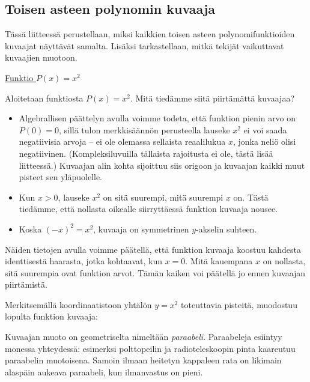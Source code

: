 \subsection*{Toisen asteen polynomin kuvaaja}
\label{paraabeli_tod}

Tässä liitteessä perustellaan, miksi kaikkien toisen asteen polynomifunktioiden kuvaajat näyttävät samalta. Lisäksi tarkastellaan, mitkä tekijät vaikuttavat kuvaajien muotoon.

\underline{Funktio $P(x)=x^2$}

Aloitetaan funktiosta $P(x)=x^2$. Mitä tiedämme siitä piirtämättä kuvaajaa?
\begin{itemize}
\item Algebrallisen päättelyn avulla voimme todeta, että funktion pienin arvo on $P(0) = 0$, sillä tulon merkkisäännön perusteella lauseke $x^2$ ei voi saada negatiivisia arvoja – ei ole olemassa sellaista reaalilukua $x$, jonka neliö olisi negatiivinen. (Kompleksiluvuilla tällaista rajoitusta ei ole, tästä lisää liitteessä.) Kuvaajan alin kohta sijoittuu siis origoon ja kuvaajan kaikki muut pisteet sen yläpuolelle.
\item Kun $x > 0$, lauseke $x^2$  on sitä
suurempi, mitä suurempi $x$ on. Tästä tiedämme, että nollasta oikealle siirryttäessä funktion kuvaaja nousee.
\item Koska $(-x)^2 = x^2$, kuvaaja on symmetrinen $y$-akselin suhteen.
\end{itemize}

Näiden tietojen avulla voimme päätellä, että funktion kuvaaja koostuu kahdesta
identtisestä haarasta, jotka kohtaavat, kun $x=0$. Mitä kauempana $x$ on nollasta, sitä suurempia ovat funktion arvot. Tämän kaiken voi päätellä jo ennen kuvaajan piirtämistä.

Merkitsemällä koordinaatistoon yhtälön $y=x^2$ toteuttavia pisteitä, muodostuu lopulta funktion kuvaaja:
\begin{center}
\begin{kuvaajapohja}{2}{-2}{2}{-1}{4}
\end{kuvaajapohja}
\end{center}

Kuvaajan muoto on geometriselta nimeltään \emph{paraabeli}. Paraabeleja esiintyy monessa yhteydessä: esimerksi polttopeilin ja radioteleskoopin pinta kaareutuu paraabelin muotoisena. Samoin ilmaan heitetyn kappaleen rata on likimain alaspäin aukeava paraabeli, kun ilmanvastus on pieni.

